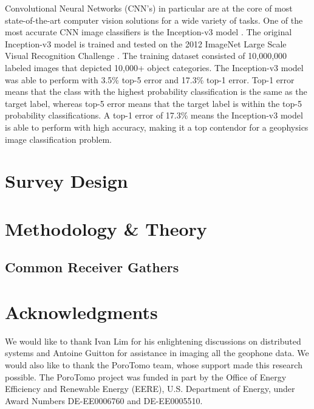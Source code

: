 Convolutional Neural Networks (CNN's) in particular are at the core of most state-of-the-art computer vision solutions for a wide variety of tasks. One of the most accurate CNN image classifiers is the Inception-v3 model \citep{Szegedy2015}. The original Inception-v3 model is trained and tested on the 2012 ImageNet Large Scale Visual Recognition Challenge \citep{ILSVRC15}. The training dataset consisted of 10,000,000 labeled images that depicted 10,000+ object categories. The Inception-v3 model was able to perform with 3.5\% top-5 error and 17.3\% top-1 error. Top-1 error means that the class with the highest probability classification is the same as the target label, whereas top-5 error means that the target label is within the top-5 probability classifications. A top-1 error of 17.3\% means the Inception-v3 model is able to perform with high accuracy, making it a top contendor for a geophysics image classification problem.

\section{Survey Design}

\section{Methodology \& Theory}
\subsection{Common Receiver Gathers}



\section{Acknowledgments}
We would like to thank Ivan Lim for his enlightening discussions on distributed systems and Antoine Guitton for assistance in  imaging all the geophone data. We would also like to thank the PoroTomo team, whose support made this research possible. The PoroTomo project was funded in part by the Office of Energy Efficiency and Renewable Energy (EERE), U.S. Department of Energy, under Award Numbers DE-EE0006760 and  DE-EE0005510.




